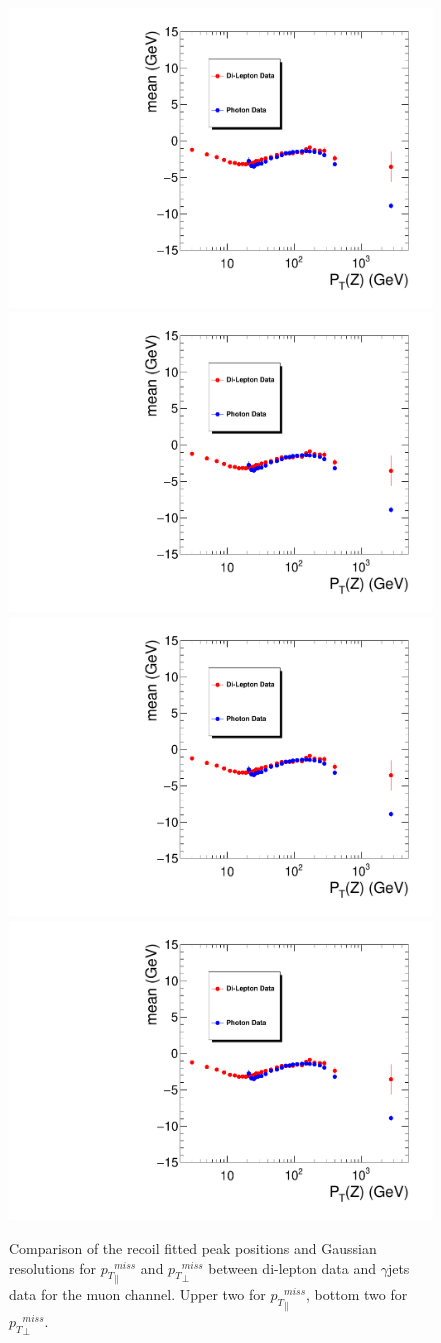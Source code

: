 \begin{figure}[htbp]
\begin{center}
\includegraphics[width=0.46\linewidth, page=1]{figures/plots_SingleEMU_Run2016Full_03Feb2017_allcorV2_met_para_study_ZSelecLowLPt_mu_VS_SinglePhoton_Run2016Full_03Feb2017_allcorV2_NoRecoil_met_para_study_ZSelecLowLPt_mu.pdf}
\includegraphics[width=0.46\linewidth, page=5]{figures/plots_SingleEMU_Run2016Full_03Feb2017_allcorV2_met_para_study_ZSelecLowLPt_mu_VS_SinglePhoton_Run2016Full_03Feb2017_allcorV2_NoRecoil_met_para_study_ZSelecLowLPt_mu.pdf}
\includegraphics[width=0.46\linewidth, page=3]{figures/plots_SingleEMU_Run2016Full_03Feb2017_allcorV2_met_para_study_ZSelecLowLPt_mu_VS_SinglePhoton_Run2016Full_03Feb2017_allcorV2_NoRecoil_met_para_study_ZSelecLowLPt_mu.pdf}
\includegraphics[width=0.46\linewidth, page=7]{figures/plots_SingleEMU_Run2016Full_03Feb2017_allcorV2_met_para_study_ZSelecLowLPt_mu_VS_SinglePhoton_Run2016Full_03Feb2017_allcorV2_NoRecoil_met_para_study_ZSelecLowLPt_mu.pdf}
\caption{Comparison of the recoil fitted peak positions and Gaussian resolutions for ${p_{T}}^{miss}_\parallel$ and ${p_{T}}^{miss}_\perp$ between di-lepton data and $\gamma$jets data for the muon channel. Upper two for 
${p_{T}}^{miss}_\parallel$, bottom two for ${p_{T}}^{miss}_\perp$.}
\label{fig:recoilfit_met_peak_reso_compare_data_gjets_mu}
\end{center}
\end{figure}

